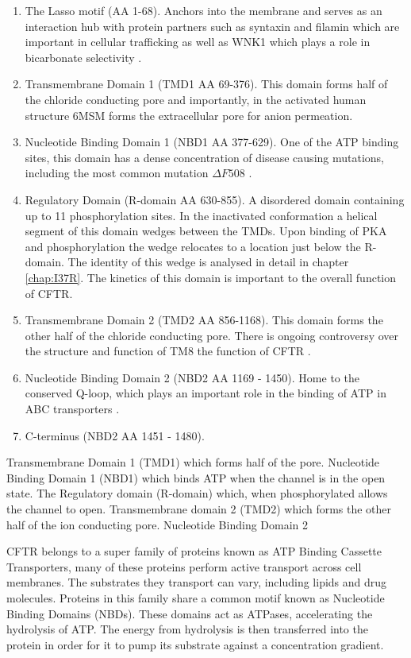 \begin{enumerate}
	\item The Lasso motif (AA 1-68). Anchors into the membrane and serves as an interaction hub with protein partners such as syntaxin and filamin which are important in cellular trafficking \cite{cormet-boyaka2002}\cite{naren1998}\cite{thelin2007} as well as WNK1 which plays a role in bicarbonate selectivity \cite{kim2019}.
	\item Transmembrane Domain 1 (TMD1 AA 69-376). This domain forms half of the chloride conducting pore and importantly, in the activated human structure 6MSM forms the extracellular  pore for anion permeation\cite{}.
	\item Nucleotide Binding Domain 1 (NBD1 AA 377-629). One of the ATP binding sites, this domain has a dense concentration of disease causing mutations, including the most common mutation $\Delta F508$ \cite{thehospitalforsickchildren2020}.
	\item Regulatory Domain (R-domain AA 630-855). A disordered domain containing up to 11 phosphorylation sites\cite{mihalyi2020}. In the inactivated conformation a helical segment of this domain wedges between the TMDs. Upon binding of PKA and phosphorylation the wedge relocates to a location just below the R-domain. The identity of this wedge is analysed in detail in chapter \ref{chap:I37R}. The kinetics of this domain is important to the overall function of CFTR. 
	\item Transmembrane Domain 2 (TMD2 AA 856-1168). This domain forms the other half of the chloride conducting pore. There is ongoing controversy over the structure and function of TM8 the function of CFTR \cite{hegedus2022}\cite{liu2019}.
	\item Nucleotide Binding Domain 2 (NBD2 AA 1169 - 1450). Home to the conserved Q-loop, which plays an important role in the binding of ATP in ABC transporters \cite{ivey2020}\cite{zolnerciks2014}\cite{dong2015}.
	\item C-terminus (NBD2 AA 1451 - 1480). 
\end{enumerate}
Transmembrane Domain 1 (TMD1) which forms half of the pore. Nucleotide Binding Domain 1 (NBD1) which binds ATP when the channel is in the open state. The Regulatory domain (R-domain) which, when phosphorylated allows the channel to open. Transmembrane domain 2 (TMD2) which forms the other half of the ion conducting pore. Nucleotide Binding Domain 2 

CFTR belongs to a super family of proteins known as ATP Binding Cassette Transporters,  many of these proteins perform active transport across cell membranes. The substrates they transport can vary, including lipids and drug molecules. Proteins in this family share a common motif known as Nucleotide Binding Domains (NBDs). These domains act as ATPases, accelerating the hydrolysis of ATP. The energy from hydrolysis is then transferred into the protein in order for it to pump its substrate against a concentration gradient. 

